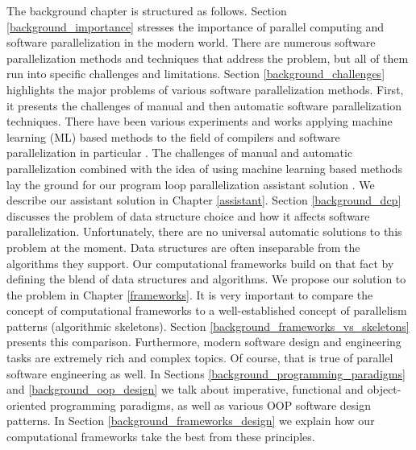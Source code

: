 % 
%
\quad The background chapter is structured as follows. Section \ref{background_importance} stresses the importance of parallel computing and software parallelization in the modern world. There are numerous software parallelization methods and techniques that address the problem, but all of them run into specific challenges and limitations. Section \ref{background_challenges} highlights the major problems of various software parallelization methods. First, it presents the challenges of manual and then automatic software parallelization techniques. There have been various experiments and works applying machine learning (ML) based methods to the field of compilers \cite{ml-oboyle} and software parallelization in particular \cite{fried_ea:2013:icmla}. The challenges of manual and automatic parallelization combined with the idea of using machine learning based methods lay the ground for our program loop parallelization assistant solution \cite{assistant-aiseps}. We describe our assistant solution in Chapter \ref{assistant}.\newline\null
\quad Section \ref{background_dcp} discusses the problem of data structure choice and how it affects software parallelization. Unfortunately, there are no universal automatic solutions to this problem at the moment. Data structures are often inseparable from the algorithms they support. Our computational frameworks build on that fact by defining the blend of data structures and algorithms. We propose our solution to the problem in Chapter \ref{frameworks}. It is very important to compare the concept of computational frameworks to a well-established concept of parallelism patterns (algorithmic skeletons). Section \ref{background_frameworks_vs_skeletons} presents this comparison. Furthermore, modern software design and engineering tasks are extremely rich and complex topics. Of course, that is true of parallel software engineering as well. In Sections \ref{background_programming_paradigms} and \ref{background_oop_design} we talk about imperative, functional and object-oriented programming paradigms, as well as various OOP software design patterns. In Section \ref{background_frameworks_design} we explain how our computational frameworks take the best from these principles.
